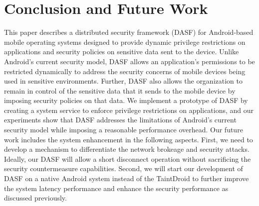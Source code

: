 \section{Conclusion and Future Work}

This paper describes a distributed security framework (DASF) for
Android-based mobile operating systems designed to provide dynamic
privilege restrictions on applications and security policies on
sensitive data sent to the device.  Unlike Android's current security
model, DASF allows an application's permissions to be restricted
dynamically to address the security concerns of mobile devices being
used in sensitive environments.  Further, DASF also allows the
organization to remain in control of the sensitive data that it sends
to the mobile device by imposing security policies on that data.  We
implement a prototype of DASF by creating a system service to enforce
privilege restrictions on applications, and our experiments show that
DASF addresses the limitations of Android's current security model
while imposing a reasonable performance overhead.  Our future work
includes the system enhancement in the following aspects.  First, we
need to develop a mechanism to differentiate the network brokeage and
security attacks.  Ideally, our DASF will allow a short disconnect
operation without sacrificing the security countermeasure
capabilities. Second, we will start our development of DASF on a
native Android system instead of the TaintDroid to further improve the
system latency performance and enhance the security performance as
discussed previously.  



